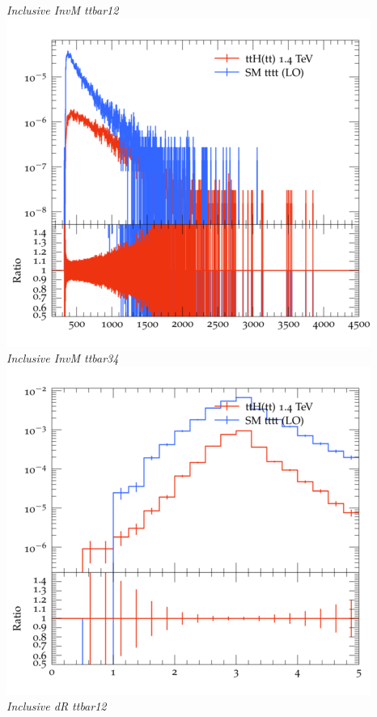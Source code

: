 \documentclass{beamer}
\begin{document}
\begin{frame}
\begin{columns}
\textit{\small Inclusive InvM ttbar12}
\includegraphics[width=\textwidth]{../plots/ttH_1400/tttt_ttH/Inclusive_InvM_ttbar34.png}\\
\textit{\small Inclusive InvM ttbar34}
\includegraphics[width=\textwidth]{../plots/ttH_1400/tttt_ttH/Inclusive_dR_ttbar12.png}\\
\textit{\small Inclusive dR ttbar12}
\end{columns}
\end{frame}
\end{document}
